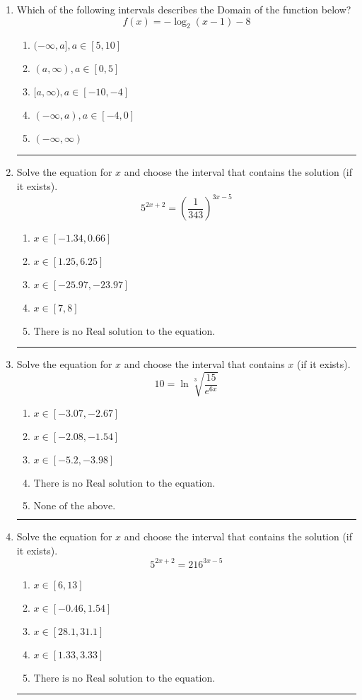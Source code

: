 \documentclass[14pt]{extbook}
\newcommand{\litem}[1]{\item#1\hspace*{-1cm}\rule{\textwidth}{0.4pt}}
\begin{document}
\begin{enumerate}
\litem{
Which of the following intervals describes the Domain of the function below?\[ f(x) = -\log_2{(x-1)}-8 \]\begin{enumerate}[label=\Alph*.]
\item \( (-\infty, a], a \in [5, 10] \)
\item \( (a, \infty), a \in [0, 5] \)
\item \( [a, \infty), a \in [-10, -4] \)
\item \( (-\infty, a), a \in [-4, 0] \)
\item \( (-\infty, \infty) \)

\end{enumerate} }
\litem{
Solve the equation for $x$ and choose the interval that contains the solution (if it exists).\[ 5^{2x+2} = \left(\frac{1}{343}\right)^{3x-5} \]\begin{enumerate}[label=\Alph*.]
\item \( x \in [-1.34, 0.66] \)
\item \( x \in [1.25, 6.25] \)
\item \( x \in [-25.97, -23.97] \)
\item \( x \in [7, 8] \)
\item \( \text{There is no Real solution to the equation.} \)

\end{enumerate} }
\litem{
 Solve the equation for $x$ and choose the interval that contains $x$ (if it exists).\[  10 = \ln{\sqrt[3]{\frac{15}{e^{6x}}}} \]\begin{enumerate}[label=\Alph*.]
\item \( x \in [-3.07, -2.67] \)
\item \( x \in [-2.08, -1.54] \)
\item \( x \in [-5.2, -3.98] \)
\item \( \text{There is no Real solution to the equation.} \)
\item \( \text{None of the above.} \)

\end{enumerate} }
\litem{
Solve the equation for $x$ and choose the interval that contains the solution (if it exists).\[ 5^{2x+2} = 216^{3x-5} \]\begin{enumerate}[label=\Alph*.]
\item \( x \in [6, 13] \)
\item \( x \in [-0.46, 1.54] \)
\item \( x \in [28.1, 31.1] \)
\item \( x \in [1.33, 3.33] \)
\item \( \text{There is no Real solution to the equation.} \)


\end{enumerate}}
\end{enumerate}
\end{document}
